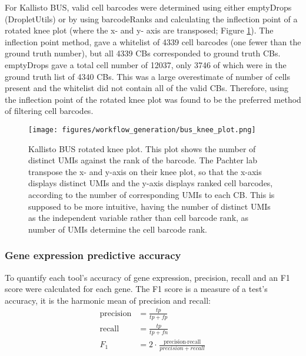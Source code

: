 For Kallisto BUS, valid cell barcodes were determined using either emptyDrops (DropletUtils) or by
using barcodeRanks and calculating the inflection point of a rotated knee plot (where the x- and y- axis are transposed; Figure \ref{fig:bus_knee}).
The inflection point method, gave a whitelist of 4339 cell barcodes (one fewer than the ground truth number), but all 4339 CBs corresponded to ground truth CBs.
emptyDrops gave a total cell number of 12037, only 3746 of which were in the ground truth list of 4340 CBs. This was a large overestimate of number of cells present and the whitelist did not contain all of the valid CBs.
Therefore, using the inflection point of the rotated knee plot was found to be the preferred method of filtering cell barcodes.

\begin{figure}[htb]
    \centering
    \texttt{[image: figures/workflow\_generation/bus\_knee\_plot.png]}
    \caption[Kallisto BUS rotated knee plot]{Kallisto BUS rotated knee plot.
    This plot shows the number of distinct UMIs against the rank of the barcode.
    The Pachter lab transpose the x- and y-axis on their knee plot, so that the x-axis displays distinct UMIs and the y-axis displays ranked cell barcodes, according to the number of corresponding UMIs to each CB. This is supposed to be more intuitive, having the number of distinct UMIs as the independent variable rather than cell barcode rank, as number of UMIs determine the cell barcode rank.}
    \label{fig:bus_knee}
\end{figure}

\subsubsection{Gene expression predictive accuracy}
To quantify each tool's accuracy of gene expression, precision, recall and an F1 score were calculated for each gene.
The F1 score is a measure of a test's accuracy, it is the harmonic mean of precision and recall:
\begin{equation}
\begin{aligned}
\text{precision} & = \frac{tp}{tp + fp}\\
%
\text{recall} & = \frac{tp}{tp + fn}\\
%
F_{1} & = 2 \cdot \frac{\text{precision} \cdot \text{recall}}{precision + recall}
\end{aligned}
\end{equation}

